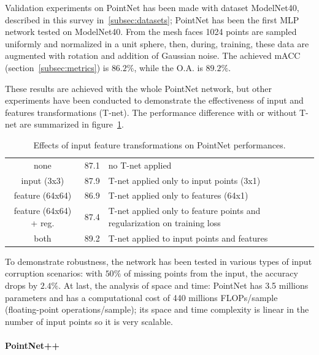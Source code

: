 Validation experiments on PointNet has been made with dataset ModelNet40, described in this survey in~\ref{subsec:datasets}; PointNet has been the first MLP network tested on ModelNet40. From the mesh faces 1024 points are sampled uniformly and normalized in a unit sphere, then, during, training, these data are augmented with rotation and addition of Gaussian noise. The achieved mACC (section~\ref{subsec:metrics}) is $86.2 \%$, while the O.A. is $89.2 \%$.

These results are achieved with the whole PointNet network, but other experiments have been conducted to demonstrate the effectiveness of input and features transformations (T-net). The performance difference with or without T-net are summarized in figure~\ref{tab:t_net_accuracies}.

\begin{table}[ht]
    \centering
    \caption{Effects of input feature transformations on PointNet performances.}
    \begin{tabular}{cc|l}
        \hline \text { \textbf{Transform} } & \text { \textbf{Accuracy} (\%) } & \text {\textbf{Description} }\\
        \hline none & 87.1 & no T-net applied \\
        \hline input (3x3) & 87.9 & T-net applied only to input points (3x1)\\
        feature (64x64)  & 86.9 & T-net applied only to features (64x1)\\
        feature (64x64) + reg. & 87.4 & T-net applied only to feature points and regularization on training loss\\
        \hline
        both & 89.2 & T-net applied to input points and features \\
        \hline
    \end{tabular}
    \label{tab:t_net_accuracies}
\end{table}

To demonstrate robustness, the network has been tested in various types of input corruption scenarios: with $50 \%$ of missing points from the input, the accuracy drops by $2.4 \%$. At last, the analysis of space and time: PointNet has 3.5 millions parameters and has a computational cost of 440 millions FLOPs/sample (floating-point operations/sample); its space and time complexity is linear in the number of input points so it is very scalable.

\paragraph{PointNet++}
\label{par:pointnet++}

